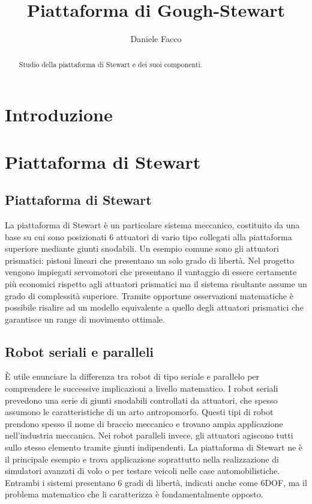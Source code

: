 \documentclass[11pt]{article}
\title{Piattaforma di Gough-Stewart}
\author{Daniele Facco}
\date{}
\begin{document}
\maketitle
\tableofcontents
\newpage

\begin{abstract}
Studio della piattaforma di Stewart e dei suoi componenti.
\end{abstract}

\section{Introduzione}\label{intro}
\section{Piattaforma di Stewart}\label{pianostewart}



\subsection{Piattaforma di Stewart}\label{piattaformastewart}
La piattaforma di Stewart è un particolare sistema meccanico, costituito da una base su cui sono posizionati 6 attuatori di vario tipo collegati alla piattaforma superiore mediante giunti snodabili. Un esempio comune sono gli attuatori prismatici: pistoni lineari che presentano un solo grado di libertà. Nel progetto vengono impiegati servomotori che presentano il vantaggio di essere certamente più economici rispetto agli attuatori prismatici ma il sistema risultante assume un grado di complessità superiore. Tramite opportune osservazioni matematiche è possibile risalire ad un modello equivalente a quello degli attuatori prismatici che garantisce un range di movimento ottimale.

\subsection{Robot seriali e paralleli}\label{robotserialiparalleli}
È utile enunciare la differenza tra robot di tipo seriale e parallelo per comprendere le successive implicazioni a livello matematico.
I robot seriali prevedono una serie di giunti snodabili controllati da attuatori, che spesso assumono le caratteristiche di un arto antropomorfo. 
Questi tipi di robot prendono spesso il nome di braccio meccanico e trovano ampia applicazione nell'industria meccanica.
Nei robot paralleli invece, gli attuatori agiscono tutti sullo stesso elemento tramite giunti indipendenti. 
La piattaforma di Stewart ne è il principale esempio e trova applicazione soprattutto nella realizzazione di simulatori avanzati di volo o per testare veicoli nelle case automobilistiche.
Entrambi i sistemi presentano 6 gradi di libertà, indicati anche come 6DOF, ma il problema matematico che li caratterizza è fondamentalmente opposto.
\end{document}
